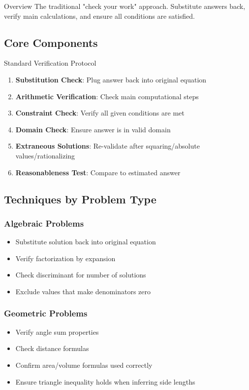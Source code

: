 \documentclass{article}
\begin{document}
\begin{standardbox}{Overview}
The traditional "check your work" approach. Substitute answers back, verify main calculations, and ensure all conditions are satisfied.
\end{standardbox}

\subsection{Core Components}

\begin{standardbox}{Standard Verification Protocol}
\begin{enumerate}
\item \textbf{Substitution Check}: Plug answer back into original equation
\item \textbf{Arithmetic Verification}: Check main computational steps
\item \textbf{Constraint Check}: Verify all given conditions are met
\item \textbf{Domain Check}: Ensure answer is in valid domain
\item \textbf{Extraneous Solutions}: Re-validate after squaring/absolute values/rationalizing
\item \textbf{Reasonableness Test}: Compare to estimated answer
\end{enumerate}
\end{standardbox}

\subsection{Techniques by Problem Type}

\subsubsection{Algebraic Problems}
\begin{itemize}
\item Substitute solution back into original equation
\item Verify factorization by expansion
\item Check discriminant for number of solutions
\item Exclude values that make denominators zero
\end{itemize}

\subsubsection{Geometric Problems}
\begin{itemize}
\item Verify angle sum properties
\item Check distance formulas
\item Confirm area/volume formulas used correctly
\item Ensure triangle inequality holds when inferring side lengths
\end{itemize}
\end{document}
